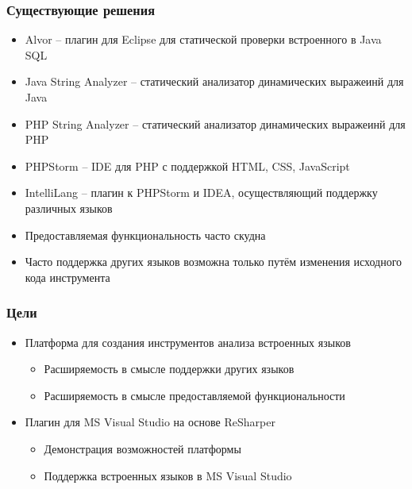 \documentclass{beamer}
\begin{document}

\begin{frame}[fragile]
	\transwipe[direction=90]
	\frametitle{Существующие решения}
	\begin{itemize}
	    \item Alvor -- плагин для Eclipse для статической проверки встроенного в Java SQL
	    \item Java String Analyzer -- статический анализатор динамических выражеинй для Java
		\item PHP String Analyzer -- статический анализатор динамических выражеинй для PHP
        \item PHPStorm -- IDE для PHP с поддержкой HTML, CSS, JavaScript
        \item IntelliLang -- плагин к PHPStorm и IDEA, осуществляющий поддержку различных языков
    \end{itemize}
    \begin{itemize}
        \item Предоставляемая функциональность часто скудна
	    \item Часто поддержка других языков возможна только путём изменения исходного кода инструмента
    \end{itemize}
\end{frame}

\begin{frame}[fragile]
	\transwipe[direction=90]
	\frametitle{Цели}
	\begin{itemize}
	    \item Платформа для создания инструментов анализа встроенных языков
    	\begin{itemize}
    		\item Расширяемость в смысле поддержки других языков
        	\item Расширяемость в смысле предоставляемой функциональности
        \end{itemize}
        \item Плагин для MS Visual Studio на основе ReSharper
    	\begin{itemize}
    		\item Демонстрация возможностей платформы
        	\item Поддержка встроенных языков в MS Visual Studio
        \end{itemize}
    \end{itemize}
\end{frame}
\end{document}
